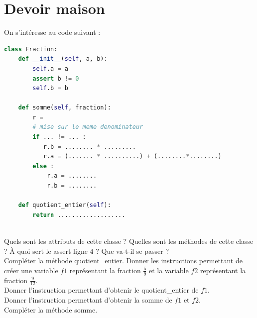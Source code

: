 \section*{Devoir maison }

On s'intéresse au code suivant :

\begin{lstlisting}[language=Python]
class Fraction:
    def __init__(self, a, b):
        self.a = a
        assert b != 0
        self.b = b

    def somme(self, fraction):
        r = 
        # mise sur le meme denominateur
        if ... != ... :
           r.b = ........ * .........
           r.a = (....... * ..........) + (........*........)
        else :
            r.a = ........ 
            r.b = ........

    def quotient_entier(self):
        return ...................
                       
\end{lstlisting}

\begin{Exercise}[title={POO}]
    \Question Quels sont les attributs de cette classe ?
    \Question Quelles sont les méthodes de cette classe ?
    \Question À quoi sert le assert ligne 4 ? Que va-t-il se passer ?\\
    \emptybox{3cm}
    \Question Compléter la méthode quotient\_entier.
    \Question Donner les instructions permettant de créer une variable $f1$ représentant la fraction $\frac{5}{9}$ et la variable $f2$ représentant la fraction $\frac{9}{12}$.\\ \emptybox{2cm}
    \Question Donner l'instruction permettant d'obtenir le quotient\_entier de $f1$.\\ \emptybox{1cm}
    \Question Donner l'instruction permettant d'obtenir la somme de $f1$ et $f2$.\\ \emptybox{1cm}
    \Question Compléter la méthode somme.
\end{Exercise}